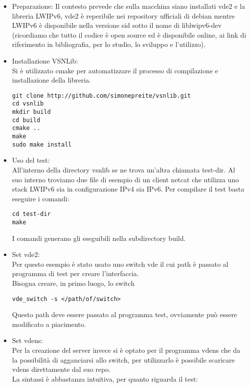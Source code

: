 \begin{itemize}
  \item Preparazione: Il contesto prevede che sulla macchina siano installati vde2 e la libreria LWIPv6, vde2 \`e reperibile nei repository ufficiali di debian mentre LWIPv6 \`e disponibile nella versione sid sotto il nome di liblwipv6-dev (ricordiamo che tutto il codice \`e open source ed \`e disponibile online, ai link di riferimento in bibliografia, per lo studio, lo sviluppo e l'utilizzo).\\
  \item Installazione VSNLib:\\
  Si \`e utilizzato cmake per automatizzare il processo di compilazione e installazione della libreria.
  \begin{lstlisting}[language=Bashn]
git clone http://github.com/simonepreite/vsnlib.git
cd vsnlib
mkdir build
cd build
cmake ..
make
sudo make install
\end{lstlisting}
  \item Uso del test:\\
  All'interno della directory vsnlib se ne trova un'altra chiamata test-dir. Al suo interno troviamo due file di esempio di un client netcat che utilizza uno stack LWIPv6 sia in configurazione IPv4 sia IPv6. Per compilare il test basta eseguire i comandi:
  \begin{lstlisting}[language=Bashn]
cd test-dir
make
\end{lstlisting}
  I comandi generano gli eseguibili nella subdirectory build.
  \item Set vde2:\\
  Per questo esempio \`e stato usato uno switch vde il cui path \`e passato al programma di test per creare l'interfaccia.\\
  Bisogna creare, in primo luogo, lo switch
  \begin{lstlisting}[language=Bashn]
vde_switch -s </path/of/switch>
\end{lstlisting}
  Questo path deve essere passato al programma test, ovviamente pu\`o essere modificato a piacimento.\\
\item Set vdens:\\
  Per la creazione del server invece si \`e optato per il programma vdens che da la possibilit\`a di agganciarsi allo switch, per utilizzarlo \`e possibile scaricare vdens direttamente dal suo repo\cite{K16}.\\
  La sintassi \`e abbastanza intuitiva, per quanto riguarda il test:

\end{itemize}
